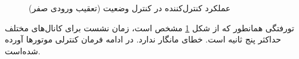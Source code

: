 \begin{figure}[H]
	\centering
{}
	\caption{‫‪عملکرد کنترل‌کننده  در کنترل وضعیت (تعقیب ورودی صفر)}
	\label{lqidg_roll_pitch_yaw_fig_simulation_ll}
\end{figure}
‌تورفتگی همانطور که از شکل
\ref{lqidg_roll_pitch_yaw_fig_simulation_ll}
مشخص است، زمان نشست برای کانال‌های مختلف حداکثر پنج ثانیه است. خطای مانگار ندارد. در ادامه فرمان کنترلی موتورها آورده شده‌است.

